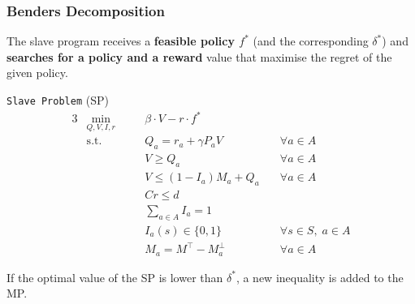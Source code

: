 \documentclass{beamer}
\begin{document}
\begin{frame}
\frametitle{Benders Decomposition}
The slave program receives a \textbf{feasible policy $f^*$} (and the corresponding $\delta^*$) and 
\textbf{searches for a policy and a reward} value that maximise the regret of the given policy.
\begin{block}{\texttt{Slave Problem} (SP)}
\begin{alignat}{3}
&\min_{Q, V, I, r} && \beta \cdot V - r \cdot f^* \\
&\text{s.t.} && Q_a = r_a + \gamma P_aV &\quad \forall a \in A\\
&& \quad& V \geq Q_a  &\quad \forall a \in A\\
&& \quad& V \leq (1-I_a)M_a + Q_a  &\quad \forall a \in A\\
&& \quad& Cr \leq d \\
&& \quad& \sum_{a \in A} I_a = 1  \label{eq:sum_I}\\
&& \quad& I_a(s) \in \{0, 1 \} &\quad \forall s \in S, \; a \in A \label{eq:bin_I}\\
&& \quad& M_a = M^{\top} - M_a^{\perp} &\quad \forall a \in A
\end{alignat}
\end{block}

If the optimal value of the SP is lower than $\delta^*$, a new inequality is added to the MP.

\end{frame}
\end{document}
